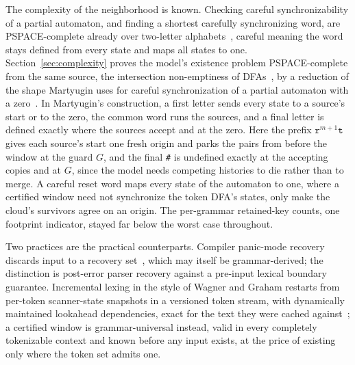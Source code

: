 \documentclass[11pt,a4paper]{article}
\theoremstyle{definition}
\theoremstyle{plain}
\newcommand{\code}[1]{\texttt{#1}}
\begin{document}
The complexity of the neighborhood is known. Checking careful synchronizability of a partial automaton, and finding a
shortest carefully synchronizing word, are PSPACE-complete already over two-letter
alphabets~\cite[Theorem~1]{martyugin2010careful}, careful meaning the word stays defined from every state and maps all
states to one. Section~\ref{sec:complexity} proves the model's existence problem PSPACE-complete from the same source,
the intersection non-emptiness of DFAs~\cite{kozen1977lower}, by a reduction of the shape Martyugin uses for careful
synchronization of a partial automaton with a zero~\cite[Proposition~2]{martyugin2010careful}. In Martyugin's
construction, a first letter sends every state to a source's start or to the zero, the common word runs the sources, and
a final letter is defined exactly where the sources accept and at the zero. Here the prefix $\code{r}^{m+1}\code{t}$
gives each source's start one fresh origin and parks the pairs from before the window at the guard $G$, and the final
\code{\#} is undefined exactly at the accepting copies and at $G$, since the model needs competing histories to die
rather than to merge. A careful reset word maps every state of the automaton to one, where a certified window need not
synchronize the token DFA's states, only make the cloud's survivors agree on an origin. The per-grammar retained-key
counts, one footprint indicator, stayed far below the worst case throughout.

Two practices are the practical counterparts. Compiler panic-mode recovery discards input to a recovery
set~\cite[Section~4.1]{dragon1986}, which may itself be grammar-derived; the distinction is post-error parser recovery
against a pre-input lexical boundary guarantee. Incremental lexing in the style of Wagner and Graham restarts from
per-token scanner-state snapshots in a versioned token stream, with dynamically maintained lookahead dependencies, exact
for the text they were cached against~\cite{wagner1997lexing}; a certified window is grammar-universal instead, valid in
every completely tokenizable context and known before any input exists, at the price of existing only where the token
set admits one.
\end{document}
